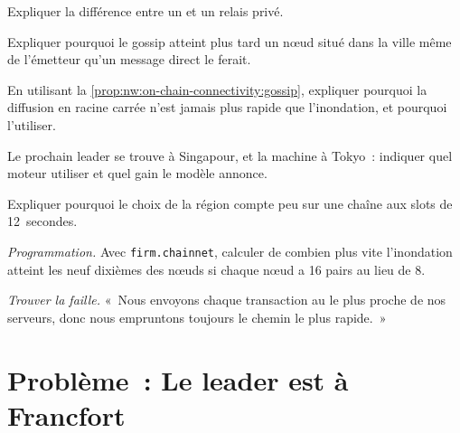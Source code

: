 \begin{exercise}[$\star$]\label{exo:nw:on-chain-connectivity:2}
Expliquer la différence entre un  et un relais privé.
\end{exercise}

\begin{exercise}[$\star$]\label{exo:nw:on-chain-connectivity:3}
Expliquer pourquoi le gossip atteint plus tard un nœud situé dans la ville même de l'émetteur qu'un message direct le ferait.
\end{exercise}

\begin{exercise}[$\star\star$]\label{exo:nw:on-chain-connectivity:4}
En utilisant la \cref{prop:nw:on-chain-connectivity:gossip}, expliquer pourquoi la diffusion en racine carrée n'est jamais plus rapide que l'inondation, et pourquoi l'utiliser.
\end{exercise}

\begin{exercise}[$\star\star$]\label{exo:nw:on-chain-connectivity:5}
Le prochain leader se trouve à Singapour, et la machine à Tokyo~: indiquer quel moteur utiliser et quel gain le modèle annonce.
\end{exercise}

\begin{exercise}[$\star\star$]\label{exo:nw:on-chain-connectivity:6}
Expliquer pourquoi le choix de la région compte peu sur une chaîne aux slots de 12~secondes.
\end{exercise}

\begin{exercise}[$\star\star\star$]\label{exo:nw:on-chain-connectivity:7}
\emph{Programmation.} Avec \texttt{firm.chainnet}, calculer de combien plus vite l'inondation atteint les neuf dixièmes des nœuds si chaque nœud a 16 pairs au lieu de 8.
\end{exercise}

\begin{exercise}[$\star\star\star$]\label{exo:nw:on-chain-connectivity:8}
\emph{Trouver la faille.} «~Nous envoyons chaque transaction au  le plus proche de nos serveurs, donc nous empruntons toujours le chemin le plus rapide.~»
\end{exercise}

\section{Problème~: Le leader est à Francfort}

